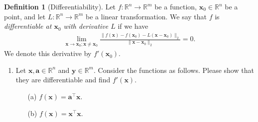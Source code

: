 \documentclass[11pt,letter,notitlepage]{article}
\theoremstyle{definition}
\newtheorem{definition}{Definition}
\begin{document}
\newpage
	\begin{exercise}
	
	\begin{definition}[Differentiability]\cite{Tao}\label{def:diff}
	    Let $f:\mathbb{R}^n\rightarrow\mathbb{R}^m$ be a function, $\mathbf{x}_0\in\mathbb{R}^n$ be a point, and let $L:\mathbb{R}^n\rightarrow\mathbb{R}^m$ be a linear transformation. We say that $f$ is \emph{differentiable at $\mathbf{x}_0$ with derivative $L$} if we have
	    \begin{align*}
	        \lim_{\mathbf{x}\rightarrow\mathbf{x}_0;\mathbf{x}\neq\mathbf{x}_0}\frac{\|f(\mathbf{x})-f(\mathbf{x}_0)-L(\mathbf{x}-\mathbf{x}_0)\|_2}{\|\mathbf{x}-\mathbf{x}_0\|_2}=0.
	    \end{align*}
	    We denote this derivative by $f'(\mathbf{x}_0)$.
	\end{definition}
		\begin{enumerate}
			\item 	Let $\mathbf{x},\mathbf{a}\in \mathbb{R}^n$ and $\mathbf{y}\in \mathbb{R}^m$. Consider the functions as follows. Please show that they are differentiable and find $f'(\mathbf{x})$.
			\begin{enumerate}
				\item[(a)] $f(\mathbf{x}) = \mathbf{a}^{\top}\mathbf{x}$.
				\item[(b)] $f(\mathbf{x}) = \mathbf{x}^{\top}\mathbf{x}$.
				

\end{enumerate}
\end{enumerate}
\end{exercise}
\end{document}
